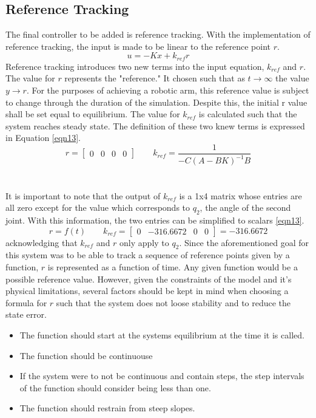 \documentclass[12pt]{article}
\begin{document}
\subsection{Reference Tracking}
The final controller to be added is reference tracking. With the implementation of reference tracking, the input is made to be linear to the reference point $r$. 
\\
\begin{equation}
\label{eqn11}
u = -K x + k_{ref} r
\end{equation}
Reference tracking introduces two new terms into the input equation, $k_{ref}$ and $r$. The value for $r$ represents the "reference." It chosen such that as $t \rightarrow \infty$ the value $y \rightarrow r$. For the purposes of achieving a robotic arm, this reference value is subject to change through the duration of the simulation. Despite this, the initial r value shall be set equal to equilibrium. The value for $k_{ref}$ is calculated such that the system reaches steady state. The definition of these two knew terms is expressed in Equation \ref{eqn13}. 
\begin{equation}
\label{eqn13}
r = \begin{bmatrix} 0 & 0 & 0 & 0\end{bmatrix}
\qquad
k_{ref} = \frac{1}{-C(A-BK)^{-1} B}
\end{equation}
\\ \\ 
It is important to note that the output of $k_{ref}$ is a 1x4 matrix whose entries are all zero except for the value which corresponds to $q_{2}$, the angle of the second joint. With this information, the two entries can be simplified to scalars 
\ref{eqn13}. 
\begin{equation}
\label{eqn13}
r = f(t)
\qquad
k_{ref} = \begin{bmatrix} 0 & -316.6672 & 0 & 0\end{bmatrix} = -316.6672
\end{equation}
acknowledging that $k_{ref}$ and $r$ only apply to $q_{2}$. Since the aforementioned goal for this system was to be able to track a sequence of reference points given by a function, $r$ is represented as a function of time. Any given function would be a possible reference value. However, given the constraints of the model and it's physical limitations, several factors should be kept in mind when choosing a formula for $r$ such that the system does not loose stability and to reduce the state error.
\begin{itemize}
	\item The function should start at the systems equilibrium at the time it is called. 
	\item The function should be continuouse
	\item If the system were to not be continuous and contain steps, the step intervals of the function should consider being less than one.
	\item The function should restrain from steep slopes.
\end{itemize}
\end{document}
